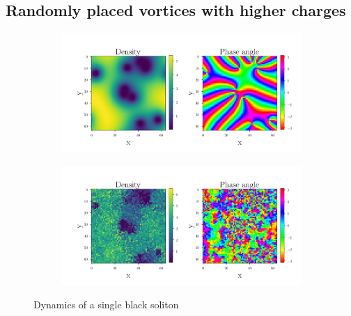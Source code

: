\subsection{Randomly placed vortices with higher charges}
 \begin{figure}[H]
 \centering
 \begin{subfigure}{0.8\textwidth} 
 	\includegraphics[width= \textwidth]{figures/vortex_2_0}
 \end{subfigure}
 \end{figure}
 \newpage
 \begin{figure}
 \begin{subfigure}{0.8\textwidth} 
 	\includegraphics[width= \textwidth]{figures/vortex_2_80}
 \end{subfigure}
 \caption{Dynamics of a single black soliton}	
 \end{figure}
 
